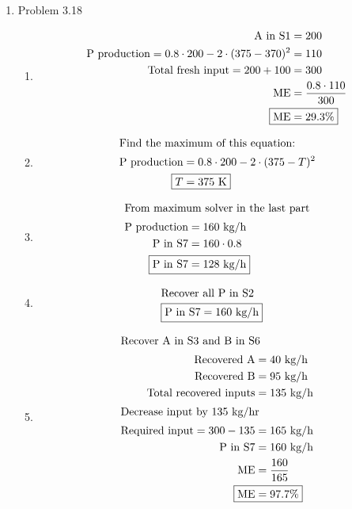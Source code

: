 \documentclass[12pt]{article}
\begin{document}
\begin{enumerate}
\newpage
    \item Problem 3.18
    \begin{enumerate}
        \item 
        \begin{align*}
            \text{A in S1} &= 200 \\
            \text{P production} = 0.8 \cdot 200 - 2 \cdot (375 - 370)^2 &= 110 \\
            \text{Total fresh input} = 200 + 100 &= 300 \\
            \mathrm{ME} &= \frac{0.8 \cdot 110}{300} \\ 
            \Aboxed{\mathrm{ME} &= 29.3 \%}
        \end{align*}
        \item 
        \begin{align*}
            \intertext{Find the maximum of this equation:} 
            \text{P production} &= 0.8 \cdot 200 - 2 \cdot (375 - T)^2 \\  
            \Aboxed{T &= 375 \text{ K}}
        \end{align*}
        \item 
        \begin{align*}
            \intertext{From maximum solver in the last part}
            \text{P production} &= 160 \text{ kg/h} \\
            \text{P in S7} &= 160 \cdot 0.8 \\ 
            \Aboxed{\text{P in S7} &= 128 \text{ kg/h}}    
        \end{align*}
        \item 
        \begin{align*}
            \intertext{Recover all P in S2}
            \Aboxed{\text{P in S7} &= 160 \text{ kg/h}}
        \end{align*}
        \item 
        \begin{align*}
            \intertext{Recover A in S3 and B in S6}
            \text{Recovered A} &= 40 \text{ kg/h} \\
            \text{Recovered B} &= 95 \text{ kg/h} \\  
            \text{Total recovered inputs} &= 135 \text{ kg/h} \\
            \intertext{Decrease input by 135 kg/hr}
            \text{Required input} = 300 - 135 &= 165 \text{ kg/h} \\
            \text{P in S7} &= 160 \text{ kg/h} \\
            \mathrm{ME} &= \frac{160}{165} \\
            \Aboxed{\mathrm{ME} &= 97.7 \%}
        \end{align*}
    \end{enumerate}


\end{enumerate}
\end{document}
